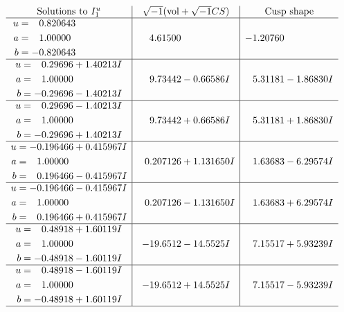 \documentclass[1p]{elsarticle_modified}
\theoremstyle{definition}
\newcommand{\I}{\sqrt{-1}}
\begin{document}
$$\begin{array}{c|c|c}  
\text{Solutions to }I^u_{1}& \I (\text{vol} + \sqrt{-1}CS) & \text{Cusp shape}\\
 \hline 
\begin{aligned}
u &= \phantom{-}0.820643\phantom{ +0.000000I} \\
a &= \phantom{-}1.00000\phantom{ +0.000000I} \\
b &= -0.820643\phantom{ +0.000000I}\end{aligned}
 & \phantom{-}4.61500\phantom{ +0.000000I} & -1.20760\phantom{ +0.000000I} \\ \hline\begin{aligned}
u &= \phantom{-}0.29696 + 1.40213 I \\
a &= \phantom{-}1.00000\phantom{ +0.000000I} \\
b &= -0.29696 - 1.40213 I\end{aligned}
 & \phantom{-}9.73442 - 0.66586 I & \phantom{-}5.31181 - 1.86830 I \\ \hline\begin{aligned}
u &= \phantom{-}0.29696 - 1.40213 I \\
a &= \phantom{-}1.00000\phantom{ +0.000000I} \\
b &= -0.29696 + 1.40213 I\end{aligned}
 & \phantom{-}9.73442 + 0.66586 I & \phantom{-}5.31181 + 1.86830 I \\ \hline\begin{aligned}
u &= -0.196466 + 0.415967 I \\
a &= \phantom{-}1.00000\phantom{ +0.000000I} \\
b &= \phantom{-}0.196466 - 0.415967 I\end{aligned}
 & \phantom{-}0.207126 + 1.131650 I & \phantom{-}1.63683 - 6.29574 I \\ \hline\begin{aligned}
u &= -0.196466 - 0.415967 I \\
a &= \phantom{-}1.00000\phantom{ +0.000000I} \\
b &= \phantom{-}0.196466 + 0.415967 I\end{aligned}
 & \phantom{-}0.207126 - 1.131650 I & \phantom{-}1.63683 + 6.29574 I \\ \hline\begin{aligned}
u &= \phantom{-}0.48918 + 1.60119 I \\
a &= \phantom{-}1.00000\phantom{ +0.000000I} \\
b &= -0.48918 - 1.60119 I\end{aligned}
 & -19.6512 - 14.5525 I & \phantom{-}7.15517 + 5.93239 I \\ \hline\begin{aligned}
u &= \phantom{-}0.48918 - 1.60119 I \\
a &= \phantom{-}1.00000\phantom{ +0.000000I} \\
b &= -0.48918 + 1.60119 I\end{aligned}
 & -19.6512 + 14.5525 I & \phantom{-}7.15517 - 5.93239 I\\
 \hline 
 \end{array}$$\newpage\newpage\renewcommand{\arraystretch}{1}
\end{document}
